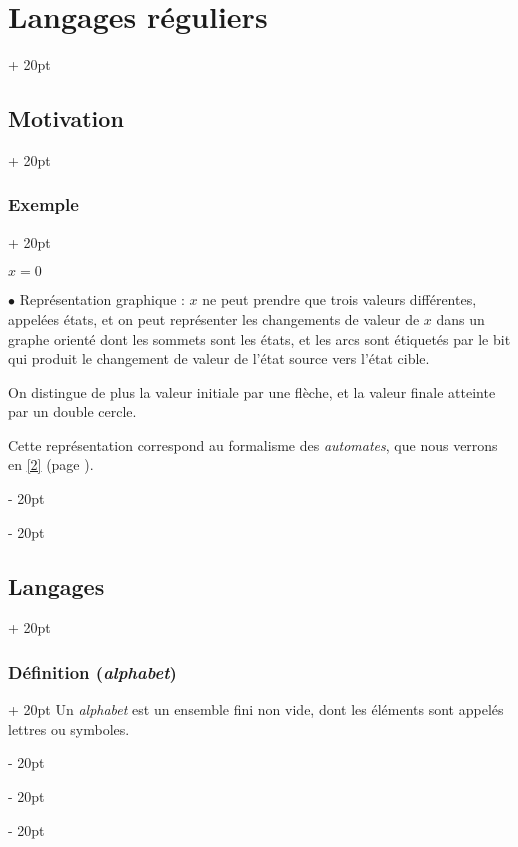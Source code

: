 \documentclass[a4paper, 12pt, twoside]{article}
\newenvironment{indalgo}[2][H]{
    \begin{algoBox}
        \begin{algorithm}[#1]
            \caption{#2}
}
{
        \end{algorithm}
    \end{algoBox}
}
\newcommand{\ind}[1][20pt]{\advance\leftskip + #1}
\newcommand{\deind}[1][20pt]{\advance\leftskip - #1}
\newenvironment{indt}[2][20pt]{#2 \par \ind[#1]}{\par \deind} %
\begin{document}
\begin{indt}{\section{Langages réguliers}}
\begin{indt}{\subsection{Motivation}}
\begin{indt}{\subsubsection{Exemple}}
\begin{indalgo}{Exemple}
                    \KwRet $x = 0$\;
                \end{indalgo}

                \vspace{12pt}
                
                $\bullet$ Représentation graphique : $x$ ne peut prendre que trois valeurs différentes, appelées états, et on peut représenter les changements de valeur de $x$ dans un graphe orienté dont les sommets sont les états, et les arcs sont étiquetés par le bit qui produit le changement de valeur de l'état source vers l'état cible.

                \begin{center}
                \end{center}

                On distingue de plus la valeur initiale par une flèche, et la valeur finale atteinte par un double cercle.

                Cette représentation correspond au formalisme des \emph{automates}, que nous verrons en \ref{2} (page \pageref{2}).
            \end{indt}
        \end{indt}

        \vspace{12pt}
        
        \begin{indt}{\subsection{Langages}}
            \begin{indt}{\subsubsection{Définition (\textit{alphabet})}}
                Un \emph{alphabet} est un ensemble fini non vide, dont les éléments sont appelés lettres ou symboles.


\end{indt}
\end{indt}
\end{indt}
\end{document}
